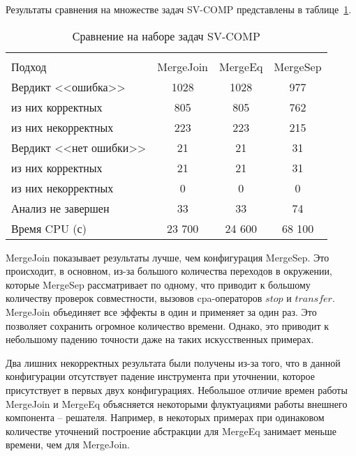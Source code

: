 Результаты сравнения на множестве задач SV-COMP представлены в таблице~\ref{table-sv-comp-merge}.

  \begin{table}[h]\footnotesize \centering
    \caption{Сравнение на наборе задач SV-COMP}
  	\label{table-sv-comp-merge}
    \begin{tabular}{ | l | c | c | c | }
      \hline
      		& 		\multicolumn{3}{c|}{\theory}  \\
      Подход         				& MergeJoin & MergeEq 	& MergeSep   \\ \hline
      Вердикт <<ошибка>> 			& 1028    	& 1028		& 977         \\ 
  \hspace{0.5cm} из них корректных 	& 805 		& 805 		& 762      \\ 
  \hspace{0.5cm} из них некорректных & 223 		& 223 		& 215        \\ \hline
      Вердикт <<нет ошибки>>  		& 21      	& 21        & 31       \\ 
  \hspace{0.5cm} из них корректных 	& 21 		& 21    	& 31        \\
  \hspace{0.5cm} из них некорректных & 0 		& 0    		& 0         \\ \hline
      Анализ не завершен       		& 33     	& 33        & 74       \\ \hline
      Время CPU (с)   				& 23 700 	& 24 600    & 68 100    \\ 
      \hline
    \end{tabular}
  \end{table}

MergeJoin показывает результаты лучше, чем конфигурация MergeSep.
Это происходит, в основном, из-за большого количества переходов в окружении, которые MergeSep рассматривает по одному, что приводит к большому количеству проверок совместности, вызовов cpa-операторов $stop$ и $transfer$.
MergeJoin объединяет все эффекты в один и применяет за один раз. Это позволяет сохранить огромное количество времени.
Однако, это приводит к небольшому падению точности даже на таких искусственных примерах.

Два лишних некорректных результата были получены из-за того, что в данной конфигурации отсутствует падение инструмента при уточнении, которое присутствует в первых двух конфигурациях.
Небольшое отличие времен работы MergeJoin и MergeEq объясняется некоторыми флуктуациями работы внешнего компонента -- решателя. 
Например, в некоторых примерах при одинаковом количестве уточнений построение абстракции для MergeEq занимает меньше времени, чем для MergeJoin.

